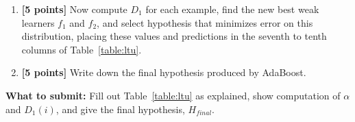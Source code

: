 \begin{enumerate}
\begin{enumerate}
   \item {\bf [5 points]} Now compute $D_1$ for each example, find the new best weak learners $f_1$ and $f_2$, and select hypothesis that
    minimizes error on this distribution, placing these values and
    predictions in the seventh to tenth columns of Table~\ref{table:ltu}.

  \item {\bf [5 points]} Write down the final hypothesis produced by AdaBoost.

\end{enumerate}

\textbf{What to submit:} Fill out Table~\ref{table:ltu} as explained, show computation of $\alpha$ and $D_1(i)$, and give the final hypothesis, $H_{\textit{final}}$.


\end{enumerate}






